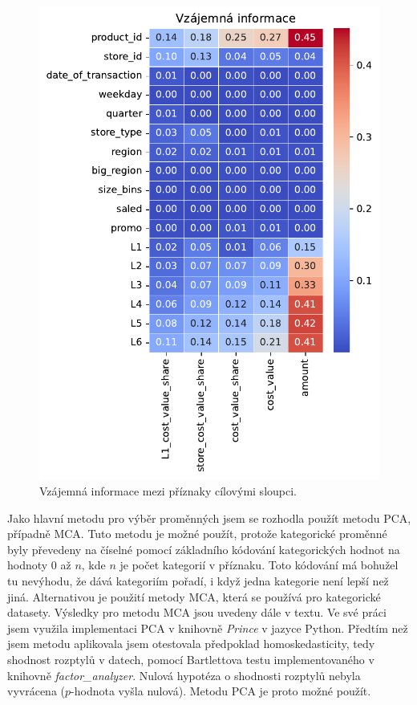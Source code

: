 \begin{figure}[h!]
    \centering
    \includegraphics[width=\textwidth]{obrazky/pripravadat/matrix_MI-everything-SFF-stores-002.pdf}
    \caption{Vzájemná informace mezi příznaky cílovými sloupci.}
    \label{obr:nb:MI_FS}

  \end{figure}

Jako hlavní metodu pro výběr proměnných jsem se rozhodla použít metodu PCA, případně MCA. Tuto metodu je možné použít, protože kategorické proměnné byly převedeny na číselné pomocí základního kódování kategorických hodnot na hodnoty 0 až $n$, kde $n$ je počet kategorií v příznaku. Toto kódování má bohužel tu nevýhodu, že dává kategoriím pořadí, i když jedna kategorie není lepší než jiná. Alternativou je použití metody MCA, která se používá pro kategorické datasety. Výsledky pro metodu MCA jsou uvedeny dále v textu.
Ve své práci jsem využila implementaci PCA v knihovně \emph{Prince} v jazyce Python. 
Předtím než jsem metodu aplikovala jsem otestovala předpoklad homoskedasticity, tedy shodnost rozptylů v datech, pomocí Bartlettova testu implementovaného v knihovně \emph{factor\_analyzer}. Nulová hypotéza o shodnosti rozptylů nebyla vyvrácena ($p$-hodnota vyšla nulová). Metodu PCA je proto možné použít.

